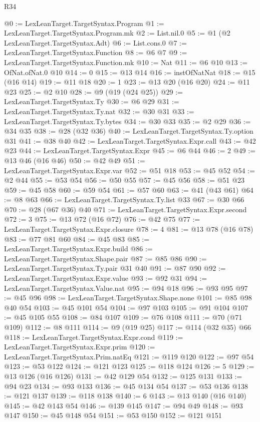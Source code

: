 \begin{lexlean}{R34}
\begin{coremodule}
@0 := LexLeanTarget.TargetSyntax.Program
@1 := LexLeanTarget.TargetSyntax.Program.mk
@2 := List.nil.{0}
@5 := @1 (@2 LexLeanTarget.TargetSyntax.Adt)
@6 := List.cons.{0}
@7 := LexLeanTarget.TargetSyntax.Function
@8 := @6 @7
@9 := LexLeanTarget.TargetSyntax.Function.mk
@10 := Nat
@11 := @6 @10
@13 := OfNat.ofNat.{0} @10
@14 := 0
@15 := @13 @14
@16 := instOfNatNat
@18 := @15 (@16 @14)
@19 := @11 @18
@20 := 1
@23 := @13 @20 (@16 @20)
@24 := @11 @23
@25 := @2 @10
@28 := @9 (@19 (@24 @25))
@29 := LexLeanTarget.TargetSyntax.Ty
@30 := @6 @29
@31 := LexLeanTarget.TargetSyntax.Ty.nat
@32 := @30 @31
@33 := LexLeanTarget.TargetSyntax.Ty.bytes
@34 := @30 @33
@35 := @2 @29
@36 := @34 @35
@38 := @28 (@32 @36)
@40 := LexLeanTarget.TargetSyntax.Ty.option @31
@41 := @38 @40
@42 := LexLeanTarget.TargetSyntax.Expr.call
@43 := @42 @23
@44 := LexLeanTarget.TargetSyntax.Expr
@45 := @6 @44
@46 := 2
@49 := @13 @46 (@16 @46)
@50 := @42 @49
@51 := LexLeanTarget.TargetSyntax.Expr.var
@52 := @51 @18
@53 := @45 @52
@54 := @2 @44
@55 := @53 @54
@56 := @50 @55
@57 := @45 @56
@58 := @51 @23
@59 := @45 @58
@60 := @59 @54
@61 := @57 @60
@63 := @41 (@43 @61)
@64 := @8 @63
@66 := LexLeanTarget.TargetSyntax.Ty.list @33
@67 := @30 @66
@70 := @28 (@67 @36) @40
@71 := LexLeanTarget.TargetSyntax.Expr.second
@72 := 3
@75 := @13 @72 (@16 @72)
@76 := @42 @75
@77 := LexLeanTarget.TargetSyntax.Expr.closure
@78 := 4
@81 := @13 @78 (@16 @78)
@83 := @77 @81 @60
@84 := @45 @83
@85 := LexLeanTarget.TargetSyntax.Expr.build
@86 := LexLeanTarget.TargetSyntax.Shape.pair
@87 := @85 @86
@90 := LexLeanTarget.TargetSyntax.Ty.pair @31 @40
@91 := @87 @90
@92 := LexLeanTarget.TargetSyntax.Expr.value
@93 := @92 @31
@94 := LexLeanTarget.TargetSyntax.Value.nat
@95 := @94 @18
@96 := @93 @95
@97 := @45 @96
@98 := LexLeanTarget.TargetSyntax.Shape.none
@101 := @85 @98 @40 @54
@103 := @45 @101 @54
@104 := @97 @103
@105 := @91 @104
@107 := @45 @105 @55
@108 := @84 @107
@109 := @76 @108
@111 := @70 (@71 @109)
@112 := @8 @111
@114 := @9 (@19 @25)
@117 := @114 (@32 @35) @66
@118 := LexLeanTarget.TargetSyntax.Expr.cond
@119 := LexLeanTarget.TargetSyntax.Expr.prim
@120 := LexLeanTarget.TargetSyntax.Prim.natEq
@121 := @119 @120
@122 := @97 @54
@123 := @53 @122
@124 := @121 @123
@125 := @118 @124
@126 := 5
@129 := @13 @126 (@16 @126)
@131 := @42 @129 @54
@132 := @125 @131
@133 := @94 @23
@134 := @93 @133
@136 := @45 @134 @54
@137 := @53 @136
@138 := @121 @137
@139 := @118 @138
@140 := 6
@143 := @13 @140 (@16 @140)
@145 := @42 @143 @54
@146 := @139 @145
@147 := @94 @49
@148 := @93 @147
@150 := @45 @148 @54
@151 := @53 @150
@152 := @121 @151

\end{coremodule}
\end{lexlean}
